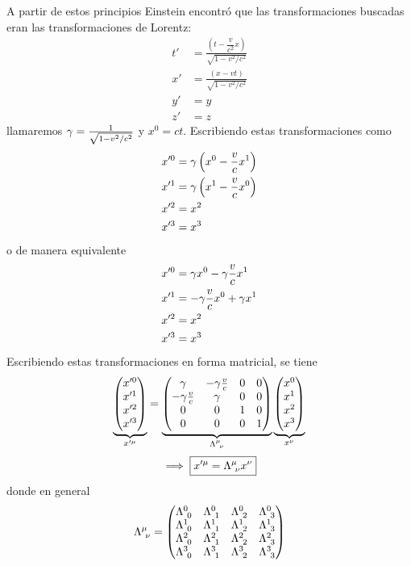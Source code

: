  A partir de estos principios Einstein encontró que las transformaciones buscadas eran las transformaciones de Lorentz:
 \begin{align}
 t'&=\frac{\left(t-\dfrac{v}{c^2}x\right)}{\sqrt{1-v^2/c^2}}\\
  x'&=\frac{(x-vt)}{\sqrt{1-v^2/c^2}}\\
y'&=y\\
z'&=z
\end{align}
llamaremos $\gamma=\frac{1}{\sqrt{1-v^2/c^2}}$ y $x^0=ct$. Escribiendo estas transformaciones como
\begin{align}
x'^0&=\gamma\left(x^0-\frac{v}{c}x^1\right)\\
  x'^1&=\gamma\left(x^1-\frac{v}{c}x^0\right)\\
  x'^2&=x^2\\
  x'^3&=x^3
\end{align}
o de manera equivalente
\begin{align}
  x'^0&=\gamma x^0-\gamma \frac{v}{c}x^1\\
  x'^1&=-\gamma \frac{v}{c}x^0+\gamma x^1\\
  x'^2&=x^2\\
  x'^3&=x^3
\end{align}
Escribiendo estas transformaciones en forma matricial, se tiene
\begin{equation}
  \underbrace{\mqty(x'^0\\x'^1\\x'^2\\x'^3)}_{x'^\m }=\underbrace{\mqty(\g&-\g\frac{v}{c}&0&0\\
  -\g\frac{v}{c}&\g&0&0\\
  0&0&1&0\\0&0&0&1)}_{\Lambda^\m _{~\n }}\underbrace{\mqty(x^0\\x^1\\x^2\\x^3)}_{x^\n }
\end{equation}
\begin{equation}
  \implies \boxed{x'^\mu =\Lambda^\mu_{~\nu }x^\nu }
\end{equation}
donde en general
\begin{equation}
  \Lambda^\m_{~\n }=\mqty(\Lambda^0_{~0}&\Lambda^0_{~1}&\Lambda^0_{~2}&\Lambda^0_{~3}\\\Lambda^1_{~0}&\Lambda^1_{~1}&\Lambda^1_{~2}&\Lambda^1_{~3}\\\Lambda^2_{~0}&\Lambda^2_{~1}&\Lambda^2_{~2}&\Lambda^2_{~3}\\\Lambda^3_{~0}&\Lambda^3_{~1}&\Lambda^3_{~2}&\Lambda^3_{~3})
\end{equation}

